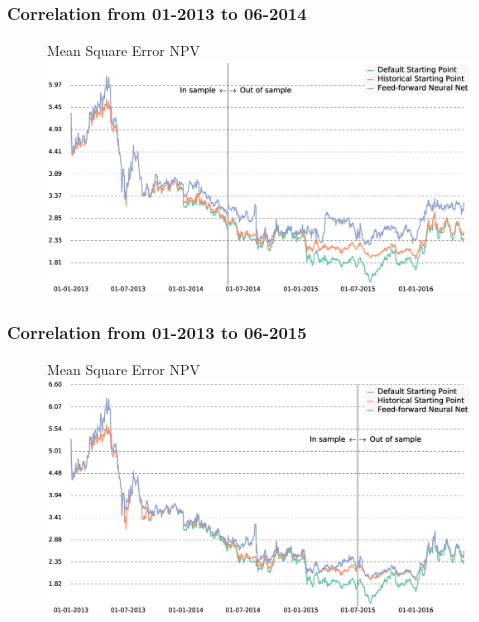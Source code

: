 \documentclass[bigger]{beamer}
\begin{document}
\begin{frame}
\frametitle{Correlation from 01-2013 to 06-2014}
  \justifying
\begin{figure}[h]
\centering
   Mean Square Error NPV\\
   \includegraphics[width=\textwidth]{Graphics/adj_error_insample40_s150k_d20_npv_error_fnn.eps}
\end{figure}
\end{frame}

\begin{frame}
\frametitle{Correlation from 01-2013 to 06-2015}
  \justifying
\begin{figure}[h]
\centering
   Mean Square Error NPV\\
   \includegraphics[width=\textwidth]{Graphics/adj_error_insample73_s150k_d20_npv_error_fnn.eps}
\end{figure}
\end{frame}
\end{document}
